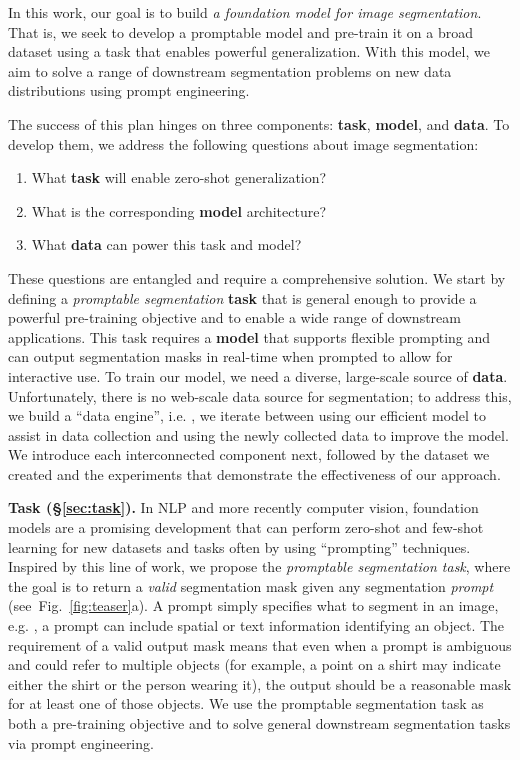 In this work, our goal is to build \emph{a foundation model for image segmentation}. That is, we seek to develop a promptable model and pre-train it on a broad dataset using a task that enables powerful generalization. With this model, we aim to solve a range of downstream segmentation problems on new data distributions using prompt engineering.

The success of this plan hinges on three components: \textbf{task}, \textbf{model}, and \textbf{data}. To develop them, we address the following questions about image segmentation:

\begin{enumerate}[itemsep=-0.6mm]
\item What \textbf{task} will enable zero-shot generalization?
\item What is the corresponding \textbf{model} architecture?
\item What \textbf{data} can power this task and model?
\end{enumerate}

These questions are entangled and require a comprehensive solution. We start by defining a \emph{promptable segmentation} \textbf{task} that is general enough to provide a powerful pre-training objective and to enable a wide range of downstream applications. This task requires a \textbf{model} that supports flexible prompting and can output segmentation masks in real-time when prompted to allow for interactive use. To train our model, we need a diverse, large-scale source of \textbf{data}. Unfortunately, there is no web-scale data source for segmentation; to address this, we build a ``data engine'', i.e. , we iterate between using our efficient model to assist in data collection and using the newly collected data to improve the model. We introduce each interconnected component next, followed by the dataset we created and the experiments that demonstrate the effectiveness of our approach.

\textbf{Task (\S\ref{sec:task}).} In NLP and more recently computer vision, foundation models are a promising development that can perform zero-shot and few-shot learning for new datasets and tasks often by using ``prompting'' techniques. Inspired by this line of work, we propose the \emph{promptable segmentation task}, where the goal is to return a \emph{valid} segmentation mask given any segmentation \emph{prompt} (see~Fig.~\ref{fig:teaser}{\color{linkcolor}a}). A prompt simply specifies what to segment in an image, e.g. , a prompt can include spatial or text information identifying an object. The requirement of a valid output mask means that even when a prompt is ambiguous and could refer to multiple objects (for example, a point on a shirt may indicate either the shirt or the person wearing it), the output should be a reasonable mask for at least one of those objects. We use the promptable segmentation task as both a pre-training objective and to solve general downstream segmentation tasks via prompt engineering.

